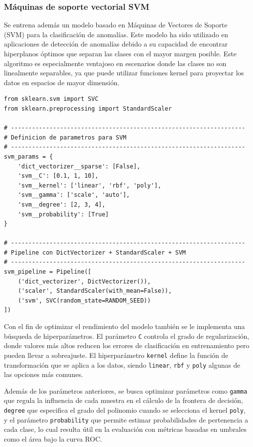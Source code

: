 \documentclass[11pt,a4paper,spanish]{book}
\numberwithin{equation}{chapter}
\numberwithin{figure}{chapter}
\begin{document}
\subsubsection{Máquinas de soporte vectorial SVM}

Se entrena además un modelo basado en Máquinas de Vectores de Soporte (SVM) para la 
clasificación de anomalías. Este modelo ha sido utilizado en aplicaciones de detección 
de anomalías debido a su capacidad de encontrar hiperplanos óptimos que separan las 
clases con el mayor margen posible. Este algoritmo es especialmente ventajoso en 
escenarios donde las clases no son linealmente separables, ya que puede utilizar 
funciones kernel para proyectar los datos en espacios de mayor dimensión. 


\vspace{5mm}
\begin{lstlisting}
from sklearn.svm import SVC
from sklearn.preprocessing import StandardScaler

# -------------------------------------------------------------------
# Definicion de parametros para SVM
# -------------------------------------------------------------------
svm_params = {
    'dict_vectorizer__sparse': [False],
    'svm__C': [0.1, 1, 10],                  
    'svm__kernel': ['linear', 'rbf', 'poly'],
    'svm__gamma': ['scale', 'auto'],         
    'svm__degree': [2, 3, 4],                
    'svm__probability': [True]               
}

# -------------------------------------------------------------------
# Pipeline con DictVectorizer + StandardScaler + SVM
# -------------------------------------------------------------------
svm_pipeline = Pipeline([
    ('dict_vectorizer', DictVectorizer()),
    ('scaler', StandardScaler(with_mean=False)),  
    ('svm', SVC(random_state=RANDOM_SEED))
])
\end{lstlisting}


Con el fin de optimizar el rendimiento del modelo también se le implementa una búsqueda 
de hiperparámetros. El parámetro \lstinline|C| controla el grado de regularización, 
donde valores más altos reducen los errores de clasificación en entrenamiento pero 
pueden llevar a sobreajuste. El hiperparámetro \lstinline|kernel| define la función de 
transformación que se aplica a los datos, siendo \lstinline|linear|, \lstinline|rbf| y 
\lstinline|poly| algunas de las opciones más comunes. 


Además de los parámetros anteriores, se busca optimizar parámetros como 
\lstinline|gamma| que regula la influencia de cada muestra en el cálculo de la frontera 
de decisión, \lstinline|degree| que especifica el grado del polinomio cuando se 
selecciona el kernel \lstinline|poly|, y el parámetro \lstinline|probability| que 
permite estimar probabilidades de pertenencia a cada clase, lo cual resulta útil en la 
evaluación con métricas basadas en umbrales como el área bajo la curva ROC. 
\end{document}

